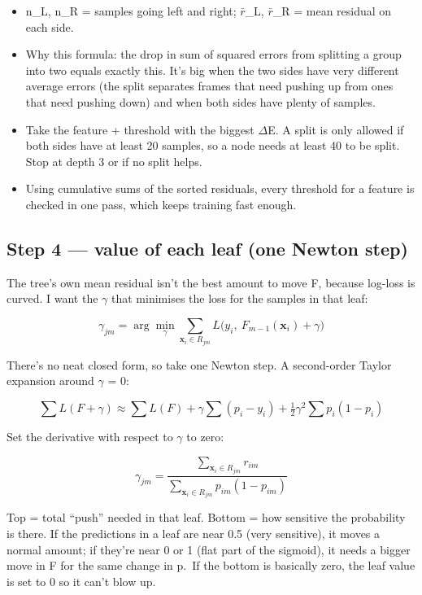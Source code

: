 \documentclass[11pt,a4paper]{article}
\providecommand{\tightlist}{\setlength{\itemsep}{0pt}\setlength{\parskip}{0pt}}
\begin{document}
\begin{itemize}
\tightlist
\item
  n\_L, n\_R = samples going
  left and right; $\bar{r}$\_L, $\bar{r}$\_R =
  mean residual on each side.
\item
  Why this formula: the drop
  in sum of squared errors
  from splitting a group into
  two equals exactly this.
  It's big when the two sides
  have very different average
  errors (the split separates
  frames that need pushing up
  from ones that need pushing
  down) and when both sides
  have plenty of samples.
\item
  Take the feature + threshold
  with the biggest $\Delta$E. A split
  is only allowed if both
  sides have at least 20
  samples, so a node needs at
  least 40 to be split. Stop
  at depth 3 or if no split
  helps.
\item
  Using cumulative sums of the
  sorted residuals, every
  threshold for a feature is
  checked in one pass, which
  keeps training fast enough.
\end{itemize}

\hypertarget{step-4-value-of-each-leaf-one-newton-step}{%
\subsection{Step 4 --- value
of each leaf (one Newton
step)}\label{step-4-value-of-each-leaf-one-newton-step}}

The tree's own mean residual
isn't the best amount to move
F, because log-loss is curved.
I want the $\gamma$ that minimises
the loss for the samples in
that leaf:

\[
\gamma_{jm} = \arg\min_{\gamma}\sum_{\mathbf{x}_i\in R_{jm}} L\big(y_i,\ F_{m-1}(\mathbf{x}_i)+\gamma\big)
\]

There's no neat closed form,
so take one Newton step. A
second-order Taylor expansion
around $\gamma$ = 0:

\[
\sum L(F+\gamma) \approx \sum L(F) + \gamma\sum (p_i - y_i) + \tfrac{1}{2}\gamma^2\sum p_i(1-p_i)
\]

Set the derivative with
respect to $\gamma$ to zero:

\[
\gamma_{jm} = \frac{\sum_{\mathbf{x}_i\in R_{jm}} r_{im}}{\sum_{\mathbf{x}_i\in R_{jm}} p_{im}(1-p_{im})}
\]

Top = total ``push'' needed in
that leaf. Bottom = how
sensitive the probability is
there. If the predictions in a
leaf are near 0.5 (very
sensitive), it moves a normal
amount; if they're near 0 or 1
(flat part of the sigmoid), it
needs a bigger move in F for
the same change in p.~If the
bottom is basically zero, the
leaf value is set to 0 so it
can't blow up.
\end{document}
